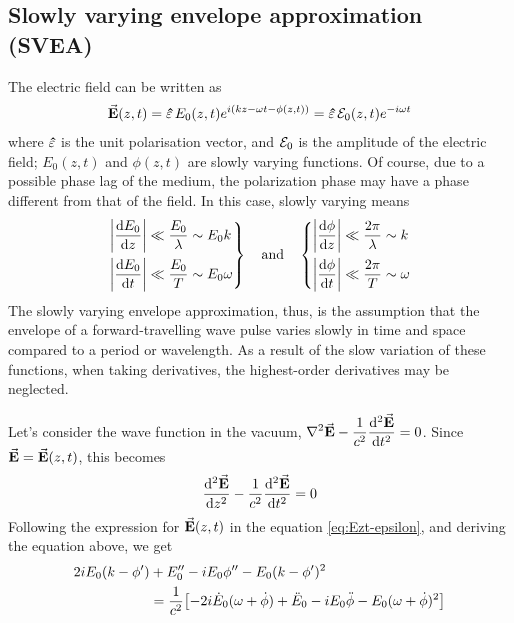 \subsection[Slowly varying envelope approximation]{Slowly varying envelope approximation (SVEA)}
The electric field can be written as
\begin{align}\label{eq:Ezt-epsilon}
	\va{E}(z,t) = \vu{\varepsilon}\, E_{0}(z,t) e^{i(kz - \omega t - \phi(z,t))} = \vu{\varepsilon}\, \mathcal{E}_{0}(z,t) e^{-i \omega t}
\end{align}
where $\vu{\varepsilon}$ is the unit polarisation vector, and $\mathcal{E}_{0}$ is the amplitude of the electric field; $E_{0}(z,t)$ and $\phi(z,t)$ are slowly varying functions. Of course, due to a possible phase lag of the medium, the polarization phase may have a phase different from that of the field. In this case, slowly varying means
\begin{align*}
	\left.
	\begin{aligned}
		\abs{\dv{E_{0}}{z}} &\ll \frac{E_{0}}{\lambda} \sim E_{0} k \\
		\abs{\dv{E_{0}}{t}} &\ll \frac{E_{0}}{T} \sim E_{0} \omega
	\end{aligned}
	\right\}
	\qand
	\left\{
	\begin{aligned}
		\abs{\dv{\phi}{z}} &\ll \frac{2 \pi}{\lambda} \sim k \\
		\abs{\dv{\phi}{t}} &\ll \frac{2 \pi}{T} \sim \omega
	\end{aligned}
	\right.
\end{align*}
The slowly varying envelope approximation, thus, is the assumption that the envelope of a forward-travelling wave pulse varies slowly in time and space compared to a period or wavelength. As a result of the slow variation of these functions, when taking derivatives, the highest-order derivatives may be neglected.

Let's consider the wave function in the vacuum, $\dsp \laplacian{\va{E}} - \frac{1}{c^{2}} \dv[2]{\va{E}}{t} = 0$. Since $\va{E} = \va{E}(z,t)$, this becomes
\begin{align}
	\dv[2]{\va{E}}{z} - \frac{1}{c^{2}} \dv[2]{\va{E}}{t} = 0
\end{align}
Following the expression for $\va{E}(z,t)$ in the equation \eqref{eq:Ezt-epsilon}, and deriving the equation above, we get
\begin{align*}
\begin{aligned}
	2i E_{0} (k - \phi') &+ E_{0}'' - i E_{0} \phi'' - E_{0} (k - \phi')^{2} \\
	&= \frac{1}{c^{2}} \qty[ -2i \dot{E}_{0} (\omega + \dot{\phi}) + \ddot{E}_{0} - i E_{0} \ddot{\phi} - E_{0} (\omega + \dot{\phi})^{2}]
\end{aligned}
\end{align*}

